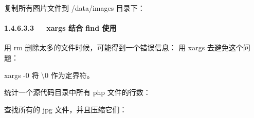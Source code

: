 \documentclass[letterpaper,12pt,english]{sphinxmanual}
\begin{document}
复制所有图片文件到 /data/images 目录下：

\begin{sphinxVerbatim}[commandchars=\\\{\}]
         
\end{sphinxVerbatim}


\paragraph{1.4.6.3.3   xargs 结合 find 使用}
\label{\detokenize{001software/001install/linux:xargs-find}}
用 rm
删除太多的文件时候，可能得到一个错误信息： 用 xargs 去避免这个问题：

\begin{sphinxVerbatim}[commandchars=\\\{\}]
           
\end{sphinxVerbatim}

xargs -0 将 \textbackslash{}0 作为定界符。

统计一个源代码目录中所有 php 文件的行数：

\begin{sphinxVerbatim}[commandchars=\\\{\}]
           
\end{sphinxVerbatim}

查找所有的 jpg 文件，并且压缩它们：

\begin{sphinxVerbatim}[commandchars=\\\{\}]
           
\end{sphinxVerbatim}
\end{document}
